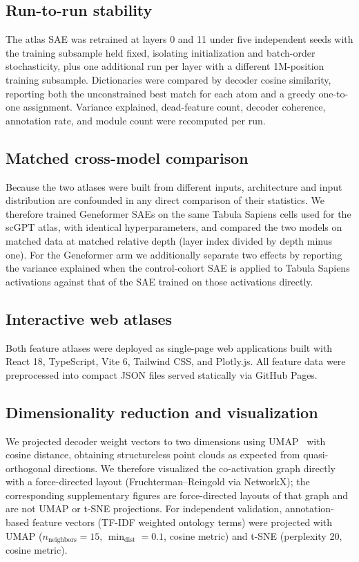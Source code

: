 \subsection*{Run-to-run stability}

The atlas SAE was retrained at layers 0 and 11 under five independent seeds with the
training subsample held fixed, isolating initialization and batch-order stochasticity, plus one
additional run per layer with a different 1M-position training subsample. Dictionaries were compared
by decoder cosine similarity, reporting both the unconstrained best match for each atom and a greedy
one-to-one assignment. Variance explained, dead-feature count, decoder coherence, annotation rate,
and module count were recomputed per run.

\subsection*{Matched cross-model comparison}

Because the two atlases were built from different inputs, architecture and input distribution are
confounded in any direct comparison of their statistics. We therefore trained Geneformer SAEs on the
same Tabula Sapiens cells used for the scGPT atlas, with identical hyperparameters, and compared the
two models on matched data at matched relative depth (layer index divided by depth minus one). For
the Geneformer arm we additionally separate two effects by reporting the variance explained when the
control-cohort SAE is applied to Tabula Sapiens activations against that of the SAE trained on those
activations directly.

\subsection*{Interactive web atlases}

Both feature atlases were deployed as single-page web applications built with React 18, TypeScript,
Vite 6, Tailwind CSS, and Plotly.js. All feature data were preprocessed into compact JSON files
served statically via GitHub Pages.

\subsection*{Dimensionality reduction and visualization}

We projected decoder weight vectors to two dimensions using UMAP~\cite{mcinnes2018umap} with cosine
distance, obtaining structureless point clouds as expected from quasi-orthogonal directions. We
therefore visualized the co-activation graph directly with a force-directed layout
(Fruchterman--Reingold via NetworkX); the corresponding supplementary figures are force-directed
layouts of that graph and are not UMAP or t-SNE projections. For independent validation,
annotation-based feature vectors (TF-IDF weighted ontology terms) were projected with UMAP
($n_\text{neighbors}=15$, $\min_\text{dist}=0.1$, cosine metric) and t-SNE (perplexity 20, cosine
metric).

